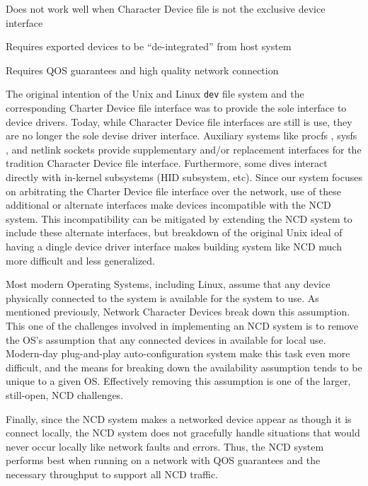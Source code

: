 \documentclass[11pt,twocolumn]{article}
\newenvironment{packed_item}{
\begin{itemize}
  \setlength{\itemsep}{1pt}
  \setlength{\parskip}{0pt}
  \setlength{\parsep}{0pt}
}{\end{itemize}}
\begin{document}
\begin{packed_item}
\item Does not work well when Character Device file is not the exclusive
  device interface
\item Requires exported devices to be ``de-integrated'' from host system
\item Requires QOS guarantees and high quality network connection
\end{packed_item}

The original intention of the Unix and Linux \texttt{dev} file
system and the corresponding Charter Device file interface was to
provide the sole interface to device drivers. Today, while Character
Device file interfaces are still is use, they are no longer the sole
devise driver interface. Auxiliary systems like procfs
\cite{interfaces}, sysfs \cite{sysfs-mochel}, and netlink sockets
\cite{netlink-ayuso} provide supplementary and/or replacement interfaces
for the tradition Character Device file interface. Furthermore, some
dives interact directly with in-kernel subsystems (HID subsystem,
etc). Since our system
focuses on arbitrating the Charter Device file interface over the
network, use of these additional or alternate interfaces make devices
incompatible with the NCD system. This incompatibility can be mitigated
by extending the NCD system to include these alternate interfaces, but
breakdown of the original Unix ideal of having a dingle device driver
interface makes building system like NCD much more difficult and less
generalized.

Most modern Operating Systems, including Linux, assume that any device
physically connected to the system is available for the system to
use. As mentioned previously, Network Character Devices break down this
assumption. This one of the challenges involved in implementing an NCD
system is to remove the OS's assumption that any connected devices in
available for local use. Modern-day plug-and-play auto-configuration
system make this task even more difficult, and the means for breaking
down the availability assumption tends to be unique to a given
OS. Effectively removing this assumption is one of the larger,
still-open, NCD challenges.

Finally, since the NCD system makes a networked device appear as
though it is connect locally, the NCD system does not gracefully
handle situations that would never occur locally like network faults
and errors. Thus, the NCD system performs best when running on a
network with QOS guarantees and the necessary throughput to support all
NCD traffic.
\end{document}
